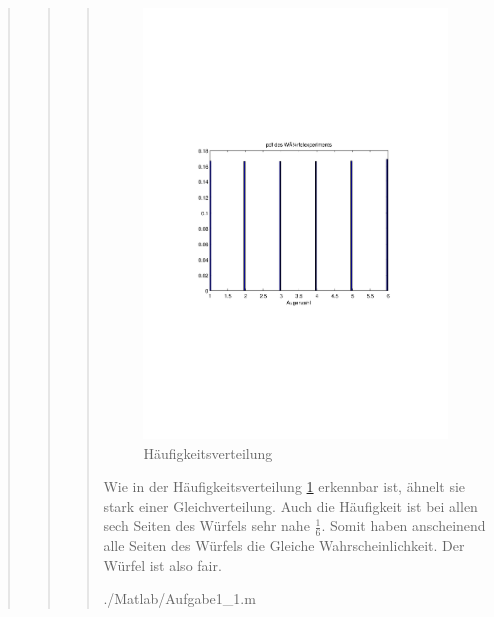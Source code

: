 \begin{quote}
\begin{quote}
\begin{quote}
            
            \begin{figure}[H]
            \centering
                \includegraphics[scale=0.7, trim = 20mm 80mm 20mm 90mm, clip]{Bilder/fairer_wuerfel}
                    \caption{Häufigkeitsverteilung}
                    \label{fig:fairer_wuerfel}
            \end{figure}
            
            Wie in der Häufigkeitsverteilung \ref{fig:fairer_wuerfel} erkennbar ist, ähnelt sie stark einer Gleichverteilung.
            Auch die Häufigkeit ist bei allen sech Seiten des Würfels sehr nahe $\frac{1}{6}$. Somit haben anscheinend alle Seiten
            des Würfels die Gleiche Wahrscheinlichkeit.
            Der Würfel ist also fair.
            
            \vspace{3em}
            
                {./Matlab/Aufgabe1_1.m}
                

\end{quote}
\end{quote}
\end{quote}
